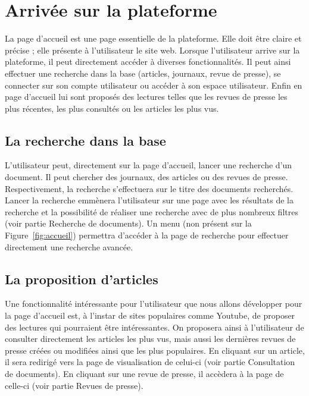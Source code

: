 \section{Arrivée sur la plateforme}
\label{sec:arrivee}

La page d’accueil est une page essentielle de la plateforme. Elle doit être claire et précise ; elle présente à l’utilisateur le site web. Lorsque l’utilisateur arrive sur la plateforme, il peut directement accéder à diverses fonctionnalités. Il peut ainsi effectuer une recherche dans la base (articles, journaux, revue de presse), se connecter sur son compte utilisateur ou accéder à son espace utilisateur. Enfin en page d'accueil lui sont proposés des lectures telles que les revues de presse les plus récentes, les plus consultés ou les articles les plus vus.

\subsection{La recherche dans la base}
\label{sec:arrivee_recherche}
L'utilisateur peut, directement sur la page d'accueil, lancer une recherche d'un document. Il peut chercher des journaux, des articles ou des revues de presse. Respectivement, la recherche s'effectuera sur le titre des documents recherchés. Lancer la recherche emmènera l'utilisateur sur une page avec les résultats de la recherche et la possibilité de réaliser une recherche avec de plus nombreux filtres (voir partie Recherche de documents). Un menu (non présent sur la Figure~\ref{fig:accueil}) permettra d'accéder à la page de recherche pour effectuer directement une recherche avancée.

\subsection{La proposition d’articles}
\label{sec:arrivee_article}
Une fonctionnalité intéressante pour l'utilisateur que nous allons développer pour la page d'accueil est, à l'instar de sites populaires comme Youtube, de proposer des lectures qui pourraient être intéressantes. On proposera ainsi à l'utilisateur de consulter directement les articles les plus vus, mais aussi les dernières revues de presse créées ou modifiées ainsi que les plus populaires. En cliquant sur un article, il sera redirigé vers la page de visualisation de celui-ci (voir partie Consultation de documents). En cliquant sur une revue de presse, il accèdera à la page de celle-ci (voir partie Revues de presse).

